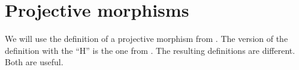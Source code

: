 \section{Projective morphisms}
\label{section-projective}

\noindent
We will use the definition of a projective morphism from \cite{EGA}.
The version of the definition with the ``H'' is the one
from \cite{H}. The resulting definitions are different. Both are useful.

